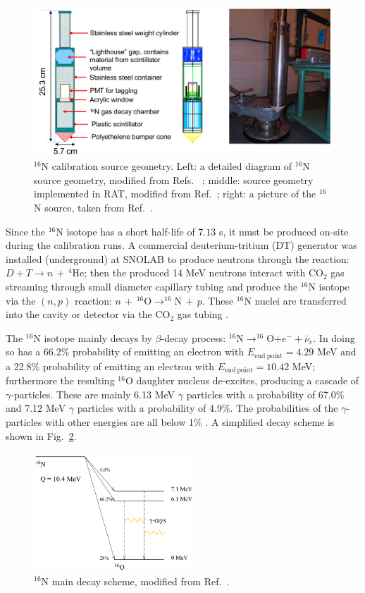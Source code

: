 \begin{figure}[!htb]
	\centering
	\includegraphics[width=12cm]{n16geom.png}
	\caption[$^{16}$N calibration source geometry.]{$^{16}$N calibration source geometry. Left: a detailed diagram of $^{16}$N source geometry, modified from Refs.~ \cite{maclellan2009energy,matt_deployedsource}; middle: source geometry implemented in RAT, modified from Ref.~\cite{n16geom_zach}; right: a picture of the $^{16}$N source, taken from Ref.~\cite{n16pic}.}
	\label{n16pic}
\end{figure}

Since the $^{16}$N isotope has a short half-life of $7.13$ s, it must be produced on-site during the calibration runs. A commercial deuterium-tritium (DT) generator was installed (underground) at SNOLAB to produce neutrons through the reaction: $D+T\to n \, + \, ^{4}$He; then the produced 14 MeV neutrons interact with CO$_2$ gas streaming through small diameter capillary tubing and produce the $^{16}$N isotope via the $(n,p)$ reaction: $n \, + \, ^{16}\mathrm{O} \to ^{16}\mathrm{N} \, + \,p$. These $^{16}$N nuclei are transferred into the cavity or detector via the CO$_2$ gas tubing \cite{dragowsky200216n}.

The $^{16}$N isotope mainly decays by $\beta$-decay process: $^{16}$N$\to ^{16}$O$+e^-+\bar{\nu}_e$. In doing so has a 66.2\% probability of emitting an electron with $E_{\mathrm{end~point}}=4.29$ MeV and a 22.8\% probability of emitting an electron with $E_{\mathrm{end~point}}=10.42$ MeV; furthermore the resulting $^{16}$O daughter nucleus de-excites, producing a cascade of $\gamma$-particles. These are mainly 6.13 MeV $\gamma$ particles with a probability of 67.0\% and 7.12 MeV $\gamma$ particles with a probability of 4.9\%. The probabilities of the $\gamma$-particles with other energies are all below 1\% \cite{nndc}. A simplified decay scheme is shown in Fig.~\ref{n16decay}.

\begin{figure}[!htb]
	\centering
	\includegraphics[width=6cm]{n16_decay.png}
	\caption[$^{16}$N main decay scheme]{$^{16}$N main decay scheme, modified from Ref.~\cite{dragowsky200216n}.}
	\label{n16decay}
\end{figure}

